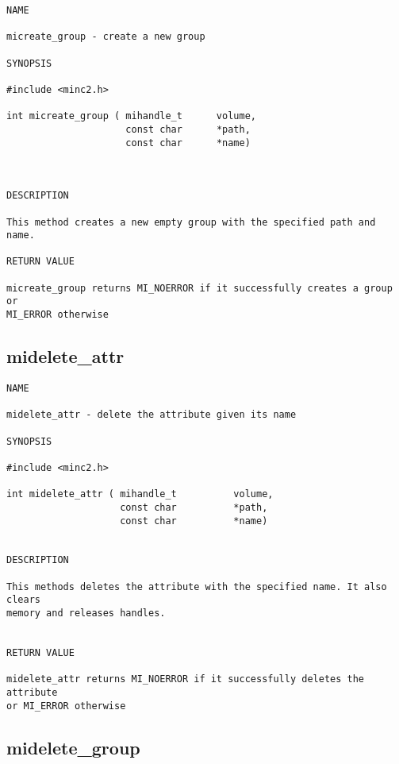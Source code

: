 \documentclass{article}
\begin{document}
\begin{verbatim}
NAME 

micreate_group - create a new group

SYNOPSIS

#include <minc2.h>

int micreate_group ( mihandle_t      volume,
                     const char      *path,
                     const char      *name)
                    
                       
                                
DESCRIPTION

This method creates a new empty group with the specified path and name.

RETURN VALUE

micreate_group returns MI_NOERROR if it successfully creates a group or 
MI_ERROR otherwise

\end{verbatim}

\subsection{midelete\_attr}

\begin{verbatim}
NAME 

midelete_attr - delete the attribute given its name

SYNOPSIS

#include <minc2.h>

int midelete_attr ( mihandle_t          volume,
                    const char          *path,
                    const char          *name)
                       
                                
DESCRIPTION

This methods deletes the attribute with the specified name. It also clears 
memory and releases handles.


RETURN VALUE

midelete_attr returns MI_NOERROR if it successfully deletes the attribute
or MI_ERROR otherwise

\end{verbatim}

\subsection{midelete\_group}
\end{document}
